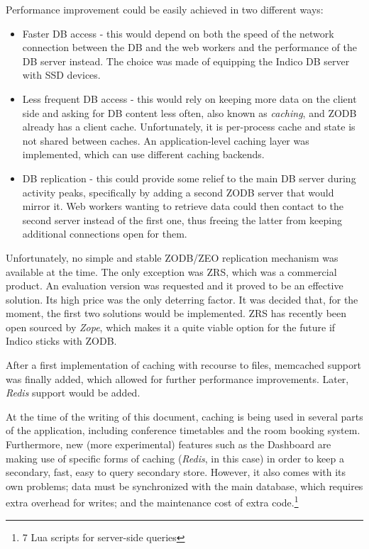 Performance improvement could be easily achieved in two different ways:

\begin{itemize}
  \item Faster DB access - this would depend on both the speed of the network connection between the DB and the web workers and the performance of the DB server instead. The choice was made of equipping the Indico DB server with SSD devices.
  \item Less frequent DB access - this would rely on keeping more data on the client side and asking for DB content less often, also known as \textit{caching}, and \textsc{ZODB} already has a client cache. Unfortunately, it is per-process cache and state is not shared between caches. An application-level caching layer was implemented, which can use different caching backends.
  \item DB replication - this could provide some relief to the main DB server during activity peaks, specifically by adding a second \textsc{ZODB} server that would mirror it. Web workers wanting to retrieve data could then contact to the second server instead of the first one, thus freeing the latter from keeping additional connections open for them.
\end{itemize}

Unfortunately, no simple and stable \textsc{ZODB}/\textsc{ZEO} replication mechanism was available at the time. The only exception was \textsc{ZRS}, which was a commercial product. An evaluation version was requested and it proved to be an effective solution. Its high price was the only deterring factor. It was decided that, for the moment, the first two solutions would be implemented. \textsc{ZRS} has recently been open sourced by \textit{Zope}, which makes it a quite viable option for the future if Indico sticks with \textsc{ZODB}.

After a first implementation of caching with recourse to files, memcached support was finally added, which allowed for further performance improvements. Later, \textit{Redis} support would be added.

At the time of the writing of this document, caching is being used in several parts of the application, including conference timetables and the room booking system. Furthermore, new (more experimental) features such as the Dashboard are making use of specific forms of caching (\textit{Redis}, in this case) in order to keep a secondary, fast, easy to query secondary store. However, it also comes with its own problems; data must be synchronized with the main database, which requires extra overhead for writes; and the maintenance cost of extra code.\footnote{7 Lua scripts for server-side queries}
 
